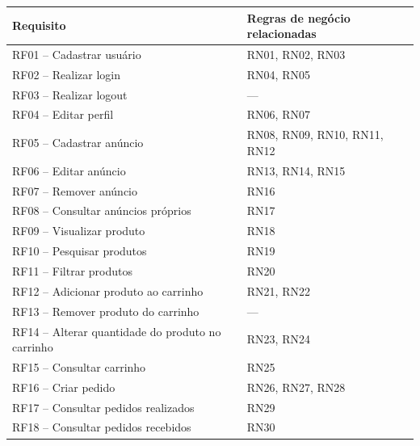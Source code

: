 \documentclass{scrreprt}
\begin{document}
\begin{center}
	\begin{tabular}{@{} p{8cm} l @{}}
		\toprule
		\textbf{Requisito}                          & \textbf{Regras de negócio relacionadas} \\
		\midrule
		RF01 -- Cadastrar usuário                   & RN01, RN02, RN03                        \\
		RF02 -- Realizar login                      & RN04, RN05                              \\
		RF03 -- Realizar logout                     & ---                                     \\
		RF04 -- Editar perfil                       & RN06, RN07                              \\
		RF05 -- Cadastrar anúncio                   & RN08, RN09, RN10, RN11, RN12            \\
		RF06 -- Editar anúncio                      & RN13, RN14, RN15                        \\
		RF07 -- Remover anúncio                     & RN16                                    \\
		RF08 -- Consultar anúncios próprios         & RN17                                    \\
		RF09 -- Visualizar produto                  & RN18                                    \\
		RF10 -- Pesquisar produtos                  & RN19                                    \\
		RF11 -- Filtrar produtos                    & RN20                                    \\
		RF12 -- Adicionar produto ao carrinho       & RN21, RN22                              \\
		RF13 -- Remover produto do carrinho         & ---                                     \\
		RF14 -- Alterar quantidade do produto no carrinho & RN23, RN24                        \\
		RF15 -- Consultar carrinho                  & RN25                                    \\
		RF16 -- Criar pedido                        & RN26, RN27, RN28                        \\
		RF17 -- Consultar pedidos realizados        & RN29                                    \\
		RF18 -- Consultar pedidos recebidos         & RN30                                    \\

\end{tabular}
\end{center}
\end{document}
